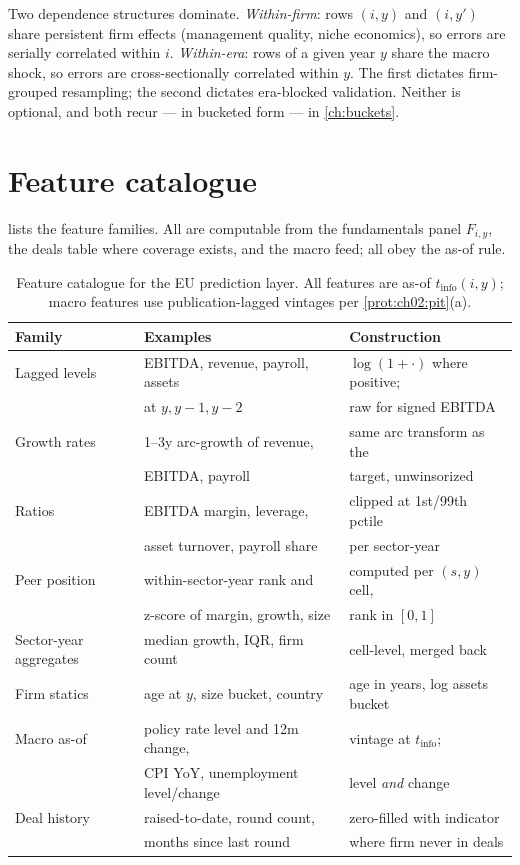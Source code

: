 Two dependence structures dominate. \emph{Within-firm}: rows $(i,y)$ and $(i,y')$ share
persistent firm effects (management quality, niche economics), so errors are serially correlated
within $i$. \emph{Within-era}: rows of a given year $y$ share the macro shock, so errors are
cross-sectionally correlated within $y$. The first dictates firm-grouped resampling; the second
dictates era-blocked validation. Neither is optional, and both recur --- in bucketed form --- in
\cref{ch:buckets}.

\section{Feature catalogue}\label{cheu:sec:features}

 lists the feature families. All are computable from the fundamentals
panel $F_{i,y}$, the deals table where coverage exists, and the macro feed; all obey the as-of
rule.

\begin{table}[htbp]
\centering
\caption{Feature catalogue for the EU prediction layer. All features
are as-of $t_{\mathrm{info}}(i,y)$; macro features use
publication-lagged vintages per \cref{prot:ch02:pit}(a).}
\label{cheu:tab:features}
\small
\begin{tabular}{@{}lll@{}}
\toprule
Family & Examples & Construction \\
\midrule
Lagged levels & EBITDA, revenue, payroll, assets & $\log(1+\cdot)$
where positive; \\
 & at $y, y{-}1, y{-}2$ & raw for signed EBITDA \\
Growth rates & 1--3y arc-growth of revenue, & same arc transform as
the \\
 & EBITDA, payroll & target, unwinsorized \\
Ratios & EBITDA margin, leverage, & clipped at 1st/99th pctile \\
 & asset turnover, payroll share & per sector-year \\
Peer position & within-sector-year rank and & computed per $(s,y)$
cell, \\
 & z-score of margin, growth, size & rank in $[0,1]$ \\
Sector-year aggregates & median growth, IQR, firm count & cell-level,
merged back \\
Firm statics & age at $y$, size bucket, country & age in years, log
assets bucket \\
Macro as-of & policy rate level and 12m change, & vintage at
$t_{\mathrm{info}}$; \\
 & CPI YoY, unemployment level/change & level \emph{and} change \\
Deal history & raised-to-date, round count, & zero-filled with
indicator \\
 & months since last round & where firm never in deals \\
\bottomrule
\end{tabular}
\end{table}

